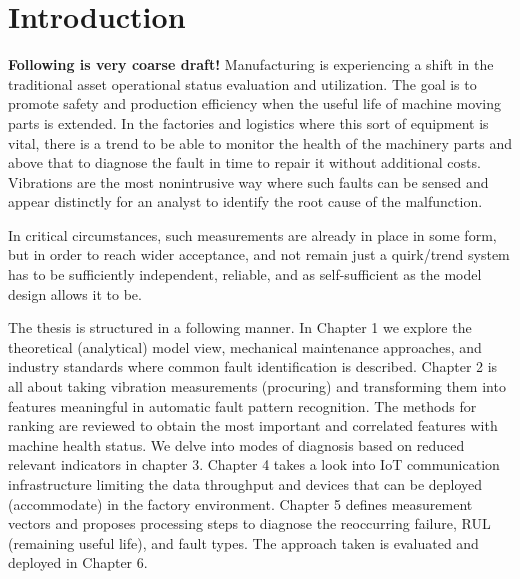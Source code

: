 \chapter{Introduction}
\textbf{Following is very coarse draft!}
Manufacturing is experiencing a shift in the traditional asset operational status evaluation and utilization. The goal is to promote safety and production efficiency when the useful life of machine moving parts is extended. In the factories and logistics where this sort of equipment is vital, there is a trend to be able to monitor the health of the machinery parts and above that to diagnose the fault in time to repair it without additional costs. Vibrations are the most nonintrusive way where such faults can be sensed and appear distinctly for an analyst to identify the root cause of the malfunction.

In critical circumstances, such measurements are already in place in some form, but in order to reach wider acceptance, and not remain just a quirk/trend system has to be sufficiently independent, reliable, and as self-sufficient as the model design allows it to be.

The thesis is structured in a following manner. In Chapter 1 we explore the theoretical (analytical) model view, mechanical maintenance approaches, and industry standards where common fault identification is described. Chapter 2 is all about taking vibration measurements (procuring) and transforming them into features meaningful in automatic fault pattern recognition. The methods for ranking are reviewed to obtain the most important and correlated features with machine health status. We delve into modes of diagnosis based on reduced relevant indicators in chapter 3. Chapter 4 takes a look into IoT communication infrastructure limiting the data throughput and devices that can be deployed (accommodate) in the factory environment. Chapter 5 defines measurement vectors and proposes processing steps to diagnose the reoccurring failure, RUL (remaining useful life), and fault types. The approach taken is evaluated and deployed in Chapter 6. 
  
